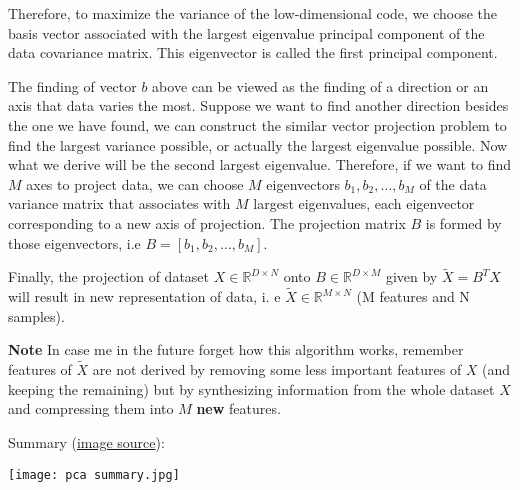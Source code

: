 \documentclass[a4paper, 12pt]{article}  %
\begin{document}
Therefore, to maximize the variance of the low-dimensional code, we choose the basis vector associated with the largest eigenvalue principal component of the data covariance matrix. This eigenvector is called the first principal component.

The finding of vector $b$ above can be viewed as the finding of a direction or an axis that data varies the most. Suppose we want to find another direction besides the one we have found, we can construct the similar vector projection problem to find the largest variance possible, or actually the largest eigenvalue possible. Now what we derive will be the second largest eigenvalue. Therefore, if we want to find $M$ axes to project data, we can choose $M$ eigenvectors $b_1, b_2, \hdots, b_M$ of the data variance matrix that associates with $M$ largest eigenvalues, each eigenvector corresponding to a new axis of projection. The projection matrix $B$ is formed by those eigenvectors, i.e $B = [b_1, b_2, \hdots, b_M]$.

Finally, the projection of dataset $X \in \mathbb{R}^{D \times N}$ onto $B \in \mathbb{R}^{D \times M}$ given by $\widetilde{X} = B^T X$ will result in new representation of data, i. e $\widetilde{X} \in \mathbb{R}^{M \times N}$ (M features and N samples). 

\textbf{Note} In case me in the future forget how this algorithm works, remember features of $\widetilde{X}$ are not derived by removing some less important features of $X$ (and keeping the remaining) but by synthesizing information from the whole dataset $X$ and compressing them into $M$ \textbf{new} features.

Summary (\href{https://machinelearningcoban.com/2017/06/15/pca/#4-cac-bc-thc-hin-pca}{image source}):
\begin{center}
  \texttt{[image: pca summary.jpg]}  
\end{center}
\end{document}
